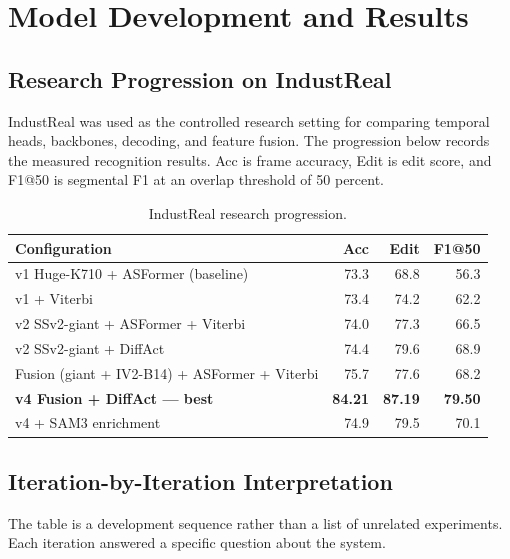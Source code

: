 \chapter{Model Development and Results}

\section{Research Progression on IndustReal}

IndustReal was used as the controlled research setting for comparing temporal
heads, backbones, decoding, and feature fusion. The progression below records
the measured recognition results. Acc is frame accuracy, Edit is edit score,
and F1@50 is segmental F1 at an overlap threshold of 50 percent.

\begin{table}[H]
\centering
\scriptsize
\begin{tabularx}{\textwidth}{@{}Xrrr@{}}
\toprule
\textbf{Configuration} & \textbf{Acc} & \textbf{Edit} & \textbf{F1@50} \\
\midrule
v1 Huge-K710 + ASFormer (baseline) & 73.3 & 68.8 & 56.3 \\
v1 + Viterbi & 73.4 & 74.2 & 62.2 \\
v2 SSv2-giant + ASFormer + Viterbi & 74.0 & 77.3 & 66.5 \\
v2 SSv2-giant + DiffAct & 74.4 & 79.6 & 68.9 \\
Fusion (giant + IV2-B14) + ASFormer + Viterbi & 75.7 & 77.6 & 68.2 \\
\textbf{v4 Fusion + DiffAct --- best} & \textbf{84.21} & \textbf{87.19} & \textbf{79.50} \\
v4 + SAM3 enrichment & 74.9 & 79.5 & 70.1 \\
\bottomrule
\end{tabularx}
\caption{IndustReal research progression.}
\label{tab:industreal-results}
\end{table}

\section{Iteration-by-Iteration Interpretation}

The table is a development sequence rather than a list of unrelated
experiments. Each iteration answered a specific question about the system.

